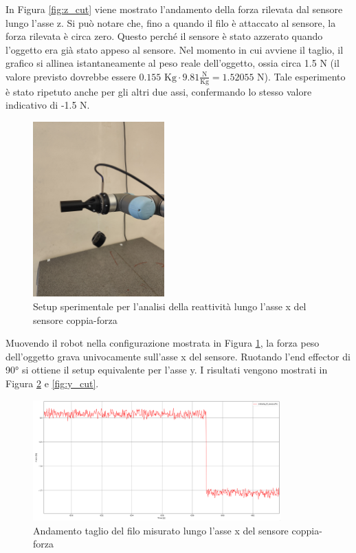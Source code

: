In Figura \ref{fig:z_cut} viene mostrato l'andamento della forza rilevata dal sensore lungo l'asse z. 
Si pu\`{o} notare che, fino a quando il filo \`{e} attaccato al sensore, la forza rilevata \`{e} circa zero. 
Questo perch\'{e} il sensore \`{e} stato azzerato quando l'oggetto era gi\`{a} stato appeso al sensore. 
Nel momento in cui avviene il taglio, il grafico si allinea istantaneamente al peso reale dell'oggetto, 
ossia circa 1.5 N (il valore previsto dovrebbe essere $0.155 \text{ Kg} \cdot 9.81 \frac{\text{N}}{\text{Kg}} = 1.52055 \text{ N}$).
Tale esperimento \`{e} stato ripetuto anche per gli altri due assi, confermando lo stesso valore indicativo di -1.5 N.
\begin{figure}[H]
    \centering
    \includegraphics*[width=0.45\textwidth]{images/setup_x.jpg}
    \caption{Setup sperimentale per l'analisi della reattivit\`{a} lungo l'asse x del sensore coppia-forza}
    \label{fig:setup_x}
\end{figure}
Muovendo il robot nella configurazione mostrata in Figura \ref{fig:setup_x}, la forza peso dell'oggetto grava univocamente sull'asse x 
del sensore. 
Ruotando l'end effector di 90° si ottiene il setup equivalente per l'asse y.
I risultati vengono mostrati in Figura \ref{fig:x_cut} e \ref{fig:y_cut}. 
\begin{figure}[H]
    \centering
    \includegraphics*[width=0.85\textwidth]{images/x_cut.png}
    \caption{Andamento taglio del filo misurato lungo l'asse x del sensore coppia-forza}
    \label{fig:x_cut}
\end{figure}
